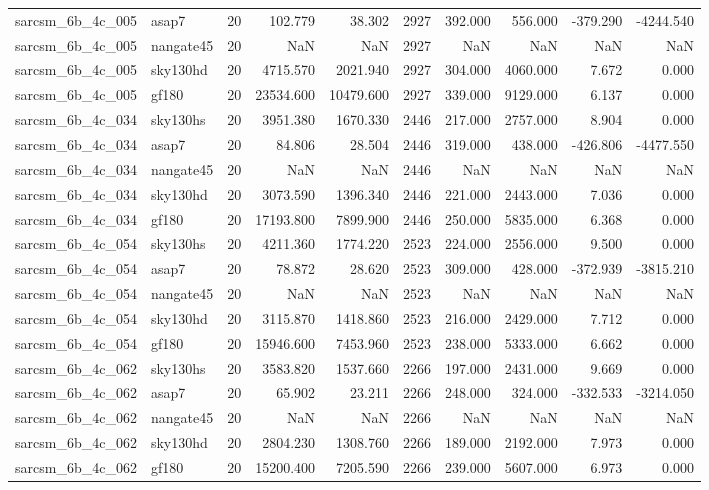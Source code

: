 \documentclass{article}
\begin{document}
\begin{longtable}{llrrrrrrrr}
sarcsm\_6b\_4c\_005 & asap7 & 20 & 102.779 & 38.302 & 2927 & 392.000 & 556.000 & -379.290 & -4244.540 \\
sarcsm\_6b\_4c\_005 & nangate45 & 20 & NaN & NaN & 2927 & NaN & NaN & NaN & NaN \\
sarcsm\_6b\_4c\_005 & sky130hd & 20 & 4715.570 & 2021.940 & 2927 & 304.000 & 4060.000 & 7.672 & 0.000 \\
sarcsm\_6b\_4c\_005 & gf180 & 20 & 23534.600 & 10479.600 & 2927 & 339.000 & 9129.000 & 6.137 & 0.000 \\
sarcsm\_6b\_4c\_034 & sky130hs & 20 & 3951.380 & 1670.330 & 2446 & 217.000 & 2757.000 & 8.904 & 0.000 \\
sarcsm\_6b\_4c\_034 & asap7 & 20 & 84.806 & 28.504 & 2446 & 319.000 & 438.000 & -426.806 & -4477.550 \\
sarcsm\_6b\_4c\_034 & nangate45 & 20 & NaN & NaN & 2446 & NaN & NaN & NaN & NaN \\
sarcsm\_6b\_4c\_034 & sky130hd & 20 & 3073.590 & 1396.340 & 2446 & 221.000 & 2443.000 & 7.036 & 0.000 \\
sarcsm\_6b\_4c\_034 & gf180 & 20 & 17193.800 & 7899.900 & 2446 & 250.000 & 5835.000 & 6.368 & 0.000 \\
sarcsm\_6b\_4c\_054 & sky130hs & 20 & 4211.360 & 1774.220 & 2523 & 224.000 & 2556.000 & 9.500 & 0.000 \\
sarcsm\_6b\_4c\_054 & asap7 & 20 & 78.872 & 28.620 & 2523 & 309.000 & 428.000 & -372.939 & -3815.210 \\
sarcsm\_6b\_4c\_054 & nangate45 & 20 & NaN & NaN & 2523 & NaN & NaN & NaN & NaN \\
sarcsm\_6b\_4c\_054 & sky130hd & 20 & 3115.870 & 1418.860 & 2523 & 216.000 & 2429.000 & 7.712 & 0.000 \\
sarcsm\_6b\_4c\_054 & gf180 & 20 & 15946.600 & 7453.960 & 2523 & 238.000 & 5333.000 & 6.662 & 0.000 \\
sarcsm\_6b\_4c\_062 & sky130hs & 20 & 3583.820 & 1537.660 & 2266 & 197.000 & 2431.000 & 9.669 & 0.000 \\
sarcsm\_6b\_4c\_062 & asap7 & 20 & 65.902 & 23.211 & 2266 & 248.000 & 324.000 & -332.533 & -3214.050 \\
sarcsm\_6b\_4c\_062 & nangate45 & 20 & NaN & NaN & 2266 & NaN & NaN & NaN & NaN \\
sarcsm\_6b\_4c\_062 & sky130hd & 20 & 2804.230 & 1308.760 & 2266 & 189.000 & 2192.000 & 7.973 & 0.000 \\
sarcsm\_6b\_4c\_062 & gf180 & 20 & 15200.400 & 7205.590 & 2266 & 239.000 & 5607.000 & 6.973 & 0.000 \\

\end{longtable}
\end{document}

